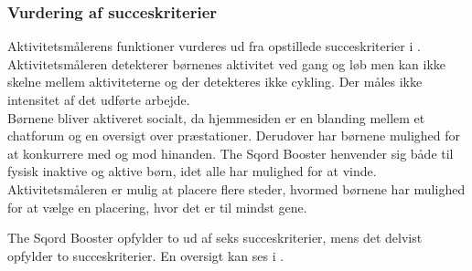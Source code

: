 \subsubsection{Vurdering af succeskriterier}
Aktivitetsmålerens funktioner vurderes ud fra opstillede succeskriterier i . \\
Aktivitetsmåleren detekterer børnenes aktivitet ved gang og løb men kan ikke skelne mellem aktiviteterne og der detekteres ikke cykling. Der måles ikke intensitet af det udførte arbejde.\\
Børnene bliver aktiveret socialt, da hjemmesiden er en blanding mellem et chatforum og en oversigt over præstationer. Derudover har børnene mulighed for at konkurrere med og mod hinanden. The Sqord Booster henvender sig både til fysisk inaktive og aktive børn, idet alle har mulighed for at vinde. Aktivitetsmåleren er mulig at placere flere steder, hvormed børnene har mulighed for at vælge en placering, hvor det er til mindst gene.~\citep{Sqord_family2015,Sqord_group2015}

The Sqord Booster opfylder to ud af seks succeskriterier, mens det delvist opfylder to succeskriterier. En oversigt kan ses i .

